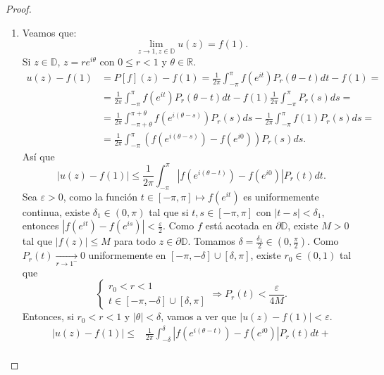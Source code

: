 \begin{proof}
\begin{enumerate}
        \item Veamos que:
              $$\lim_{z \to 1, z \in \mathbb{D}} u(z) = f(1).$$
              Si $z \in \mathbb{D}$, $z = re^{i\theta}$ con $0 \leq r < 1$ y $\theta \in \mathbb{R}$.
              \begin{align*}
                  u(z) - f(1) & = P[f](z) - f(1) = \frac{1}{2\pi} \int_{-\pi}^\pi f(e^{it})P_r(\theta-t)dt - f(1) =                                         \\
                              & = \frac{1}{2\pi} \int_{-\pi}^\pi f(e^{it})P_r(\theta-t)dt - f(1)\frac{1}{2\pi} \int_{-\pi}^\pi P_r(s)ds =                   \\
                              & = \frac{1}{2\pi} \int_{-\pi+\theta}^{\pi+\theta} f(e^{i(\theta-s)})P_r(s)ds - \frac{1}{2\pi} \int_{-\pi}^\pi f(1)P_r(s)ds = \\
                              & = \frac{1}{2\pi} \int_{-\pi}^\pi \left(f(e^{i(\theta-s)}) - f(e^{i0})\right)P_r(s)ds.
              \end{align*}
              Así que
              $$|u(z)-f(1)| \leq \frac{1}{2\pi} \int_{-\pi}^\pi \left|f\left(e^{i(\theta-t)}\right) - f\left(e^{i0}\right)\right|P_r(t)dt.$$
              Sea $\varepsilon > 0$, como la función $t \in [-\pi, \pi] \mapsto f(e^{it})$ es uniformemente continua, existe $\delta_1 \in (0, \pi)$ tal que si $t, s \in [-\pi, \pi]$ con $|t-s| < \delta_1$, entonces $|f(e^{it})-f(e^{is})| < \frac{\varepsilon}{2}$.
              Como $f$ está acotada en $\partial\mathbb{D}$, existe $M > 0$ tal que $|f(z)| \leq M$ para todo $z \in \partial\mathbb{D}$.
              Tomamos $\delta = \frac{\delta_1}{2} \in \left(0, \frac{\pi}{2}\right)$.
              Como $P_r(t) \xrightarrow[r \to 1^-]{} 0$ uniformemente en $[-\pi, -\delta] \cup [\delta, \pi]$, existe $r_0 \in (0, 1)$ tal que
              $$\begin{cases}
                      r_0 < r < 1 \\
                      t \in [-\pi, -\delta] \cup [\delta, \pi]
                  \end{cases} \Rightarrow P_r(t) < \frac{\varepsilon}{4M}.$$
              Entonces, si $r_0 < r < 1$ y $|\theta| < \delta$, vamos a ver que $|u(z)-f(1)| < \varepsilon$.
              \begin{align*}
                  |u(z)-f(1)| \leq & \frac{1}{2\pi} \int_{-\delta}^\delta \left|f\left(e^{i(\theta-t)}\right) - f\left(e^{i0}\right)\right|P_r(t)dt +                         \\

\end{align*}
\end{enumerate}
\end{proof}

